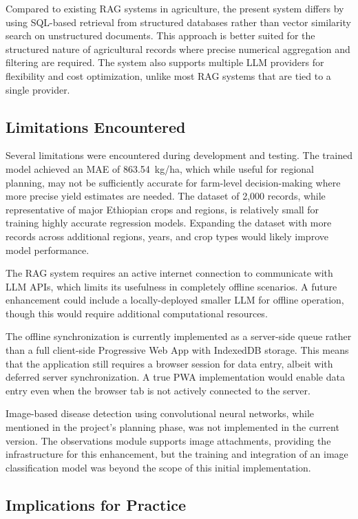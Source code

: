 Compared to existing RAG systems in agriculture, the present system differs by using SQL-based retrieval from structured databases rather than vector similarity search on unstructured documents. This approach is better suited for the structured nature of agricultural records where precise numerical aggregation and filtering are required. The system also supports multiple LLM providers for flexibility and cost optimization, unlike most RAG systems that are tied to a single provider.

\subsection{Limitations Encountered}

Several limitations were encountered during development and testing. The trained model achieved an MAE of 863.54~kg/ha, which while useful for regional planning, may not be sufficiently accurate for farm-level decision-making where more precise yield estimates are needed. The dataset of 2,000 records, while representative of major Ethiopian crops and regions, is relatively small for training highly accurate regression models. Expanding the dataset with more records across additional regions, years, and crop types would likely improve model performance.

The RAG system requires an active internet connection to communicate with LLM APIs, which limits its usefulness in completely offline scenarios. A future enhancement could include a locally-deployed smaller LLM for offline operation, though this would require additional computational resources.

The offline synchronization is currently implemented as a server-side queue rather than a full client-side Progressive Web App with IndexedDB storage. This means that the application still requires a browser session for data entry, albeit with deferred server synchronization. A true PWA implementation would enable data entry even when the browser tab is not actively connected to the server.

Image-based disease detection using convolutional neural networks, while mentioned in the project's planning phase, was not implemented in the current version. The observations module supports image attachments, providing the infrastructure for this enhancement, but the training and integration of an image classification model was beyond the scope of this initial implementation.

\subsection{Implications for Practice}

